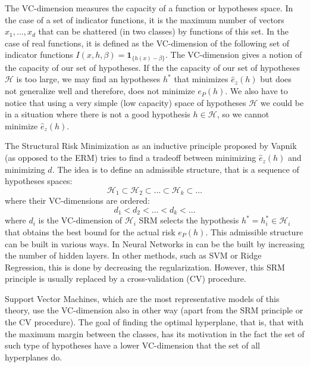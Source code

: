 The VC-dimension measures the capacity of a function or hypotheses space. In the case of a set of indicator functions, it is the maximum number of vectors $x_1, \ldots, x_d$ that can be shattered (in two classes) by functions of this set.
In the case of real functions, it is defined as the VC-dimension of the following set of indicator functions 
$ I(x, h, \beta) = \bm{1}_{\{h(x) - \beta\}} $.
The VC-dimension gives a notion of the capacity of our set of hypotheses. If the the capacity of our set of hypotheses $\mathcal{H}$ is too large, we may find an hypotheses $h^*$ that minimizes $\hat{e}_z(h)$ but does not generalize well and therefore, does not minimize $e_P(h)$. We also have to notice that using a very simple (low capacity) space of hypotheses $\mathcal{H}$ we could be in a situation where there is not a good hypothesis $h \in \mathcal{H}$, so we cannot minimize $\hat{e}_z(h)$.

The Structural Risk Minimization as an inductive principle proposed by Vapnik (as opposed to the ERM) tries to find a tradeoff between minimizing $\hat{e}_z(h)$ and minimizing $d$. The idea is to define an admissible structure, that is a sequence of hypotheses spaces:
$$ \mathcal{H}_1 \subset \mathcal{H}_2 \subset \ldots \subset \mathcal{H}_k \subset \ldots $$ 
where their VC-dimensions are ordered:
$$ d_1 < d_2 < \ldots < d_k < \ldots$$
where $d_i$ is the VC-dimension of $\mathcal{H}_i$
SRM selects the hypothesis $h^* = h_i^* \in \mathcal{H}_i$ that obtains the best bound for the actual risk $e_P(h)$.
This admissible structure can be built in various ways. In Neural Networks in can be the built by increasing the number of hidden layers. In other methods, such as SVM or Ridge Regression, this is done by decreasing the regularization.
However, this SRM principle is usually replaced by a cross-validation (CV) procedure.

Support Vector Machines, which are the most representative models of this theory, use the VC-dimension also in other way (apart from the SRM principle or the CV procedure). The goal of finding the optimal hyperplane, that is, that with the maximum margin between the classes, has its motivation in the fact the set of such type of hypotheses have a lower VC-dimension that the set of all hyperplanes do.


